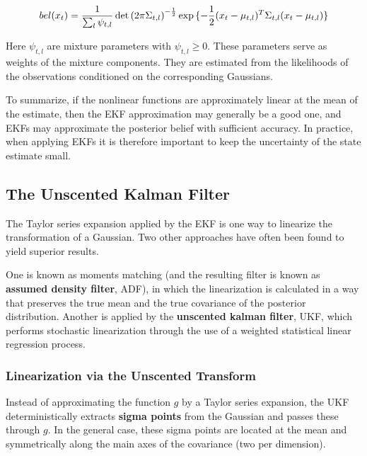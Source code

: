 \documentclass[14pt,letterpaper]{article}
\theoremstyle{definition}
\begin{document}
\begin{equation}
  bel(x_t) = \frac{1}{\sum_{l}{\psi_{t,l}}} \det{(2\pi \Sigma_{t,l})}^{-\frac{1}{2}} \exp{ \{ -\frac{1}{2} (x_t - \mu_{t,l})^T \Sigma_{t,l} (x_t - \mu_{t,l}) \}} \\
  \label{eq:Mixture of Gaussians}
\end{equation}

Here $\psi_{t,l}$ are mixture parameters with $\psi_{t,l} \geq 0$.
These parameters serve as weights of the mixture components.
They are estimated from the likelihoods of the observations conditioned on the corresponding Gaussians.

\vspace{2mm}

To summarize, if the nonlinear functions are approximately linear at the mean of the estimate, then the EKF approximation may generally be a good
one, and EKFs may approximate the posterior belief with sufficient accuracy.
In practice, when applying EKFs it is therefore important to keep the uncertainty of the state estimate small.

\newpage

\subsection{The Unscented Kalman Filter}

The Taylor series expansion applied by the EKF is one way to linearize the transformation of a Gaussian.
Two other approaches have often been found to yield superior results.

\vspace{2mm}

One is known as moments matching (and the resulting filter is known as \textbf{assumed density filter}, ADF), in which the linearization is calculated in a way that preserves the true mean and the true covariance of the posterior distribution.
Another is applied by the \textbf{unscented kalman filter}, UKF, which performs stochastic linearization through the use of a weighted statistical linear regression process.

\subsubsection{Linearization via the Unscented Transform}

Instead of approximating the function $g$ by a Taylor series expansion, the UKF deterministically extracts \textbf{sigma points} from the Gaussian and passes these through $g$.
In the general case, these sigma points are located at the mean and symmetrically along the main axes of the covariance (two per dimension).
\end{document}
